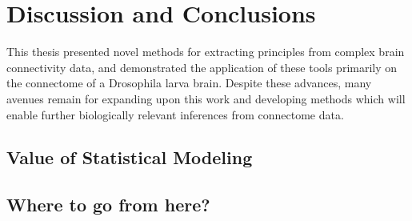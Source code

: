 \chapter{Discussion and Conclusions}\label{chap:discussion}

This thesis presented novel methods for extracting principles from complex brain connectivity data, and demonstrated the application of these tools primarily on the connectome of a Drosophila larva brain. Despite these advances, many avenues remain for expanding upon this work and developing methods which will enable further biologically relevant inferences from connectome data.

\section{Value of Statistical Modeling}
\blindtext

\section{Where to go from here?}
\blindtext